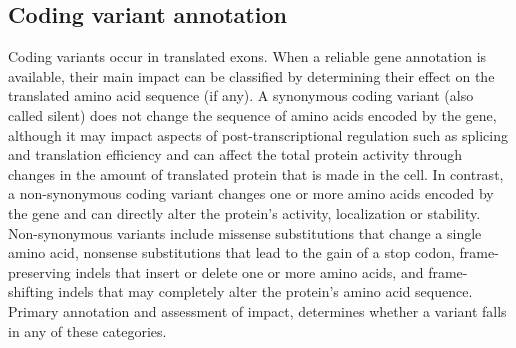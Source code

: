 \subsection{Coding variant annotation}

Coding variants occur in translated exons. When a reliable gene annotation is available, their main impact can be classified by determining their effect on the translated amino acid sequence (if any). A synonymous coding variant (also called silent) does not change the sequence of amino acids encoded by the gene, although it may impact aspects of post-transcriptional regulation such as splicing and translation efficiency and can affect the total protein activity through changes in the amount of translated protein that is made in the cell. In contrast, a non-synonymous coding variant changes one or more amino acids encoded by the gene and can directly alter the protein's activity, localization or stability. Non-synonymous variants include missense substitutions that change a single amino acid, nonsense substitutions that lead to the gain of a stop codon, frame-preserving indels that insert or delete one or more amino acids, and frame-shifting indels that may completely alter the protein's amino acid sequence. Primary annotation and assessment of impact, determines whether a variant falls in any of these categories.

